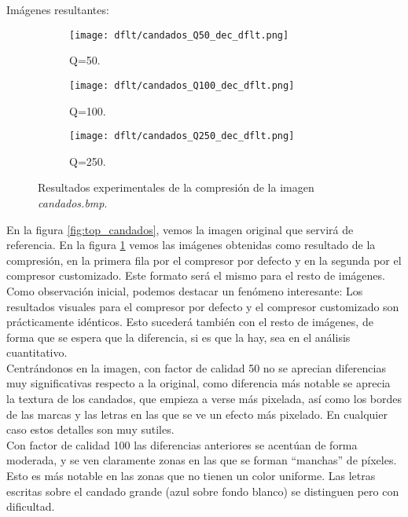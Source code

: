\documentclass[12pt,a4paper]{article}
\begin{document}
Imágenes resultantes:
\begin{figure}   [H]
    \begin{subfigure}{0.20\textwidth}
        \centering
        \texttt{[image: dflt/candados\_Q50\_dec\_dflt.png]}
        \caption{Q=50.}
        
    \end{subfigure}
    \hfill
    \begin{subfigure}{0.20\textwidth}
        \centering
        \texttt{[image: dflt/candados\_Q100\_dec\_dflt.png]}
        \caption{Q=100.}
        
    \end{subfigure}
    \hfill
    \begin{subfigure}{0.20\textwidth}
        \centering
        \texttt{[image: dflt/candados\_Q250\_dec\_dflt.png]}
        \caption{Q=250.}
        
    \end{subfigure}
    
    
    \caption[Resultados experimentales - candado]{Resultados experimentales de la compresión de la imagen \textit{candados.bmp}.}
    \label{fig:candados_cuali}
\end{figure}

En la figura \ref{fig:top_candados}, vemos la imagen original que servirá de referencia. En la figura \ref{fig:candados_cuali} vemos las imágenes obtenidas como resultado de la compresión, en la primera fila por el compresor por defecto y en la segunda por el compresor customizado. Este formato será el mismo para el resto de imágenes.\\

Como observación inicial, podemos destacar un fenómeno interesante: Los resultados visuales para el compresor por defecto y el compresor customizado son prácticamente idénticos. Esto sucederá también con el resto de imágenes, de forma que se espera que la diferencia, si es que la hay, sea en el análisis cuantitativo.\\

Centrándonos en la imagen, con factor de calidad 50 no se aprecian diferencias muy significativas respecto a la original, como diferencia más notable se aprecia la textura de los candados, que empieza a verse más pixelada, así como los bordes de las marcas y las letras en las que se ve un efecto más pixelado. En cualquier caso estos detalles son muy sutiles.\\

Con factor de calidad 100 las diferencias anteriores se acentúan de forma moderada, y se ven claramente zonas en las que se forman ``manchas'' de píxeles. Esto es más notable en las zonas que no tienen un color uniforme. Las letras escritas sobre el candado grande (azul sobre fondo blanco) se distinguen pero con dificultad.\\
\end{document}
